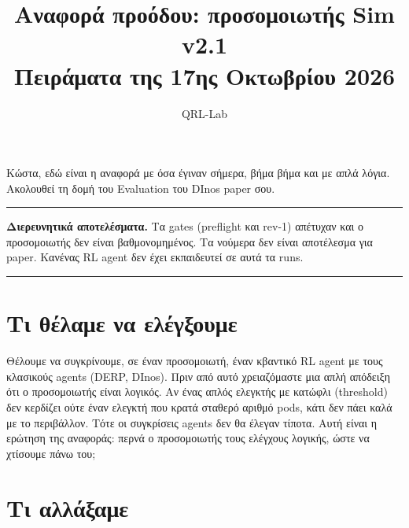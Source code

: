 \documentclass[11pt,a4paper]{article}
\title{\sffamily Αναφορά προόδου: προσομοιωτής Sim v2.1\\\large Πειράματα της 17ης Οκτωβρίου 2026}
\author{QRL-Lab}
\date{}
\newenvironment{warn}{\par\medskip\noindent\begin{minipage}{\linewidth}\color{red!50!black}\rule{\linewidth}{0.6pt}\par\small\sffamily}{\par\rule{\linewidth}{0.6pt}\end{minipage}\par\medskip}
\begin{document}
\maketitle

Κώστα, εδώ είναι η αναφορά με όσα έγιναν σήμερα, βήμα βήμα και με απλά λόγια. Ακολουθεί τη δομή του Evaluation του DInos paper σου.

\begin{warn}
\textbf{Διερευνητικά αποτελέσματα.} Τα gates (preflight και rev-1) απέτυχαν και ο προσομοιωτής δεν είναι βαθμονομημένος. Τα νούμερα δεν είναι αποτέλεσμα για paper. Κανένας RL agent δεν έχει εκπαιδευτεί σε αυτά τα runs.
\end{warn}

\section{Τι θέλαμε να ελέγξουμε}

Θέλουμε να συγκρίνουμε, σε έναν προσομοιωτή, έναν κβαντικό RL agent με τους κλασικούς agents (DERP, DInos). Πριν από αυτό χρειαζόμαστε μια απλή απόδειξη ότι ο προσομοιωτής είναι λογικός. Αν ένας απλός ελεγκτής με κατώφλι (threshold) δεν κερδίζει ούτε έναν ελεγκτή που κρατά σταθερό αριθμό pods, κάτι δεν πάει καλά με το περιβάλλον. Τότε οι συγκρίσεις agents δεν θα έλεγαν τίποτα. Αυτή είναι η ερώτηση της αναφοράς: περνά ο προσομοιωτής τους ελέγχους λογικής, ώστε να χτίσουμε πάνω του;

\section{Τι αλλάξαμε}
\end{document}
